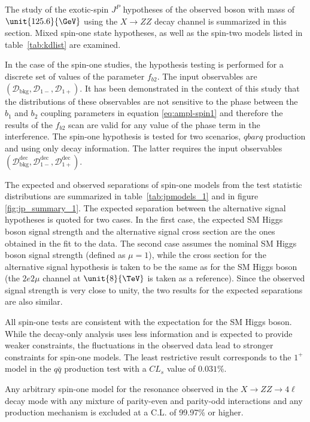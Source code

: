 The study of the exotic-spin $J^P$ hypotheses of the observed boson with mass of $\unit{125.6}{\GeV}$ using the $X \to ZZ$ decay channel is summarized in this section. Mixed spin-one state hypotheses, as well as the spin-two models listed in table~\ref{tab:kdlist} are examined.

In the case of the spin-one studies, the hypothesis testing is performed for a discrete set of values of the parameter $f_{b2}$. The input observables are $\left(\mathcal{D}_\text{bkg}, \mathcal{D}_{1-}, \mathcal{D}_{1+}\right)$. It has been demonstrated in the context of this study that the distributions of these observables are not sensitive to the phase between the $b_1$ and $b_2$ coupling parameters in equation \eqref{eq:ampl-spin1} and therefore the results of the $f_{b2}$ scan are valid for any value of the phase term in the interference. The spin-one hypothesis is tested for
two scenarios, $qbar{q}$ production and using only decay information. The latter requires the input observables $\left(\mathcal{D}_\text{bkg}^\text{dec},\mathcal{D}_{1-}^\text{dec},\mathcal{D}_{1+}^\text{dec}\right)$.

The expected and observed separations of spin-one models from the test statistic distributions
are summarized in table~\ref{tab:jpmodels_1} and in figure \ref{fig:jp_summary_1}.
The expected separation between the alternative signal hypotheses is
quoted for two cases. In the first case, the expected SM Higgs boson
signal strength and the alternative signal cross section are
the ones obtained in the fit to the data.
The second case assumes the nominal SM Higgs boson signal strength
(defined as $\mu=1$), while the cross section for the alternative signal hypothesis is
taken to be the same as for the SM Higgs boson (the $2e2\mu$
channel at $\unit{8}{\TeV}$ is taken as a reference). Since the observed signal strength
is very close to unity, the two results for the expected separations are also similar.

All spin-one tests are consistent with the expectation for the SM Higgs boson.
While the decay-only analysis uses less information and is expected to provide weaker constraints,
the fluctuations in the observed data lead to stronger constraints for spin-one models.
The least restrictive result corresponds to the $1^+$ model in the $q\bar{q}$ production test
with a $CL_{s}$ value of $0.031\%$.

Any arbitrary spin-one model for the resonance observed in the $X \to ZZ\to 4\ell$ decay mode with any
mixture of parity-even and parity-odd interactions and any production mechanism is excluded at a C.L. of
99.97\% or higher.

